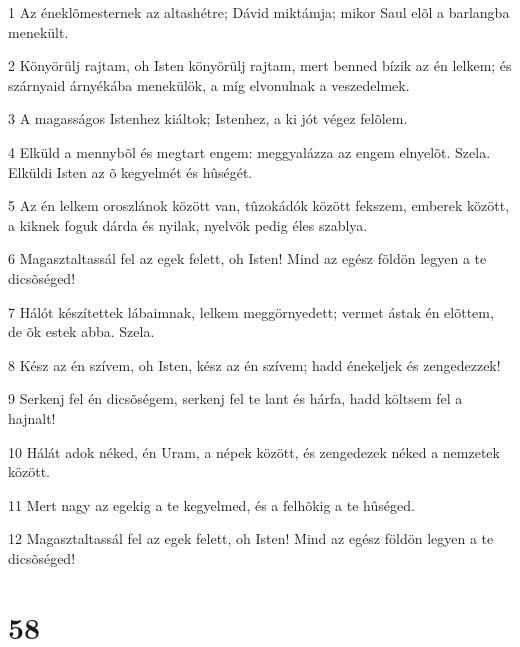 \par 1 Az éneklõmesternek az altashétre; Dávid miktámja; mikor Saul elõl a barlangba menekült.
\par 2 Könyörülj rajtam, oh Isten könyörülj rajtam, mert benned bízik az én lelkem; és szárnyaid árnyékába menekülök, a míg elvonulnak a veszedelmek.
\par 3 A magasságos Istenhez kiáltok; Istenhez, a ki jót végez felõlem.
\par 4 Elküld a mennybõl és megtart engem: meggyalázza az engem elnyelõt. Szela. Elküldi Isten az õ kegyelmét és hûségét.
\par 5 Az én lelkem oroszlánok között van, tûzokádók között fekszem, emberek között, a kiknek foguk dárda és nyilak, nyelvök pedig éles szablya.
\par 6 Magasztaltassál fel az egek felett, oh Isten! Mind az egész földön legyen a te dicsõséged!
\par 7 Hálót készítettek lábaimnak, lelkem meggörnyedett; vermet ástak én elõttem, de õk estek abba. Szela.
\par 8 Kész az én szívem, oh Isten, kész az én szívem; hadd énekeljek és zengedezzek!
\par 9 Serkenj fel én dicsõségem, serkenj fel te lant és hárfa, hadd költsem fel a hajnalt!
\par 10 Hálát adok néked, én Uram, a népek között, és zengedezek néked a nemzetek között.
\par 11 Mert nagy az egekig a te kegyelmed, és a felhõkig a te hûséged.
\par 12 Magasztaltassál fel az egek felett, oh Isten! Mind az egész földön legyen a te dicsõséged!

\chapter{58}

